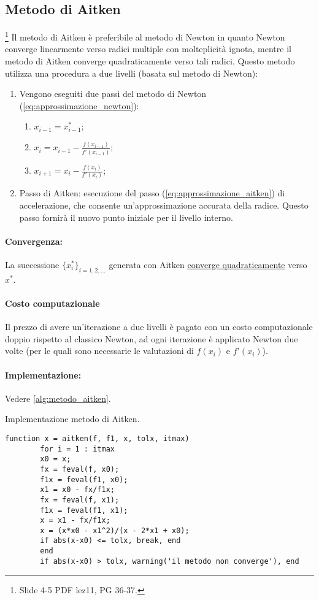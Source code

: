 \subsection{Metodo di Aitken}
\footnote{Slide 4-5 PDF lez11, PG 36-37.}
Il metodo di Aitken è preferibile al metodo di Newton in quanto Newton converge linearmente verso radici multiple con molteplicità ignota, mentre il metodo di Aitken converge quadraticamente verso tali radici. Questo metodo utilizza una procedura a due livelli (basata sul metodo di Newton):
\begin{enumerate}
	\item Vengono eseguiti due passi del metodo di Newton (\ref{eq:approssimazione_newton}): 
	\begin{enumerate}
		\item $x_{i-1}=x_{i-1}^*$;
		\item $x_i=x_{i-1}-\frac{f(x_{i-1})}{f'(x_{i-1})}$;
		\item $x_{i+1}=x_i-\frac{f(x_i)}{f'(x_i)}$;
	\end{enumerate}
	\item Passo di Aitken: esecuzione del passo (\ref{eq:approssimazione_aitken}) di accelerazione, che consente un'approssimazione accurata della radice. Questo passo fornirà il nuovo punto iniziale per il livello interno.
\end{enumerate}

\paragraph{Convergenza:} La successione $\{x_i^*\}_{i=1,2,\hdots}$ generata con Aitken \underline{converge quadraticamente} verso $x^*$.
\paragraph{Costo computazionale} Il prezzo di avere un'iterazione a due livelli è pagato con un costo computazionale doppio rispetto al classico Newton, ad ogni iterazione è applicato Newton due volte (per le quali sono necessarie le valutazioni di $f(x_i)$ e $f'(x_i)$).

\paragraph{Implementazione:} Vedere \ref{alg:metodo_aitken}.
\begin{algorithm}
	\caption{Implementazione metodo di Aitken.}\label{alg:metodo_aitken}
	\begin{lstlisting}[style=Matlab-editor]
		function x = aitken(f, f1, x, tolx, itmax)
		for i = 1 : itmax
		x0 = x;
		fx = feval(f, x0);
		f1x = feval(f1, x0);
		x1 = x0 - fx/f1x;
		fx = feval(f, x1);
		f1x = feval(f1, x1);
		x = x1 - fx/f1x;
		x = (x*x0 - x1^2)/(x - 2*x1 + x0);
		if abs(x-x0) <= tolx, break, end
		end
		if abs(x-x0) > tolx, warning('il metodo non converge'), end
	\end{lstlisting}
\end{algorithm}

